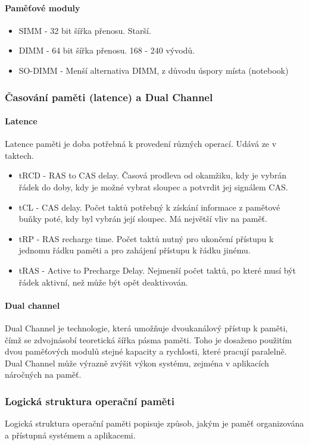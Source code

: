 \paragraph{Paměťové moduly}
\begin{itemize}
    \item SIMM - 32 bit šířka přenosu. Starší.
    \item DIMM - 64 bit šířka přenosu. 168 - 240 vývodů.
    \item SO-DIMM - Menší alternativa DIMM, z důvodu úspory místa (notebook)
\end{itemize}

\subsubsection{Časování paměti (latence) a Dual Channel}
\paragraph{Latence}
Latence paměti je doba potřebná k provedení různých operací. Udává ze v taktech.

\begin{itemize}
    \item tRCD - RAS to CAS delay. Časová prodleva od okamžiku, kdy je vybrán řádek do doby, kdy je možné vybrat sloupec a potvrdit jej signálem CAS.
    \item tCL - CAS delay.  Počet taktů potřebný k získání informace z pamětové buňky poté, kdy byl vybrán její sloupec. Má největší vliv na paměť.
    \item tRP - RAS recharge time. Počet taktů nutný pro ukončení přístupu k jednomu řádku paměti a pro zahájení přístupu k řádku jinému.
    \item tRAS - Active to Precharge Delay. Nejmenší počet taktů, po které musí být řádek aktivní, než může být opět deaktivován.
\end{itemize}

\paragraph{Dual channel}
Dual Channel je technologie, která umožňuje dvoukanálový přístup k paměti, čímž se zdvojnásobí teoretická šířka pásma paměti. Toho je dosaženo použitím dvou paměťových modulů stejné kapacity a rychlosti, které pracují paralelně. Dual Channel může výrazně zvýšit výkon systému, zejména v aplikacích náročných na paměť.

\subsubsection{Logická struktura operační paměti}
Logická struktura operační paměti popisuje způsob, jakým je paměť organizována a přístupná systémem a aplikacemi.

